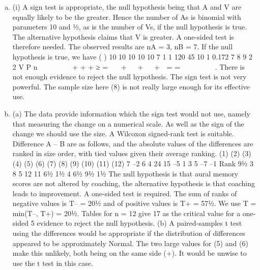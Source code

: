\documentclass[a4paper,12pt]{article}
\begin{document}
\begin{enumerate}[(a)]
\item (i) A sign test is appropriate, the null hypothesis being that A and V are equally
likely to be the greater. Hence the number of As is binomial with parameters
10 and ½, as is the number of Vs, if the null hypothesis is true. The alternative
hypothesis claims that V is greater. A one-sided test is therefore needed.
The observed results are nA = 3, nB = 7.
If the null hypothesis is true, we have
( ) 10 10
10 10 10 7 1 1 120 45 10 1 0.172
7 8 9 2 2 V P n
       + + + ≥ =   +   +   +  = =
      
.
There is not enough evidence to reject the null hypothesis.
The sign test is not very powerful. The sample size here (8) is not really large
enough for its effective use.
\item  (a) The data provide information which the sign test would not use,
namely that measuring the change on a numerical scale. As well as the
sign of the change we should use the size. A Wilcoxon signed-rank
test is suitable. Difference A – B are as follows, and the absolute
values of the differences are ranked in size order, with tied values
given their average ranking.
(1) (2) (3) (4) (5) (6) (7) (8) (9) (10) (11) (12)
7 –2 6 4 24 15 –5 1 3 5 –7 –1
Rank 9½ 3 8 5 12 11 6½ 1½ 4 6½ 9½ 1½
The null hypothesis is that aural memory scores are not altered by
coaching, the alternative hypothesis is that coaching leads to
improvement. A one-sided test is required.
The sum of ranks of negative values is T– = 20½ and of positive values
is T+ = 57½. We use T = min(T–, T+) = 20½. Tables for n = 12 give 17
as the critical value for a one-sided 5%
evidence to reject the null hypothesis.
(b) A paired-samples t test using the differences would be appropriate if
the distribution of differences appeared to be approximately Normal.
The two large values for (5) and (6) make this unlikely, both being on
the same side (+). It would be unwise to use the t test in this case.
\end{enumerate}
\end{document}
